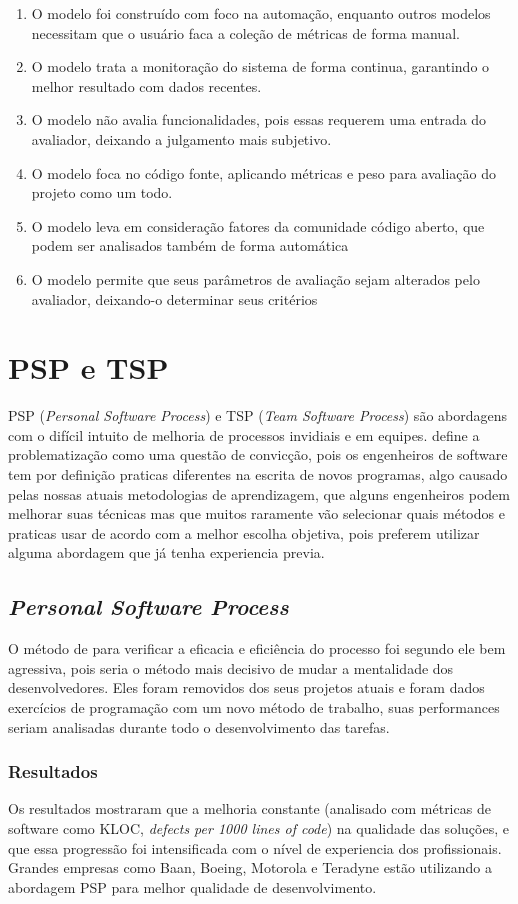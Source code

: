 \documentclass[12pt]{article}
\begin{document}
\begin{enumerate}
    \item O modelo foi construído com foco na automação, enquanto outros modelos necessitam que o usuário faca a coleção de métricas de forma manual.
    \item O modelo trata a monitoração do sistema de forma continua, garantindo o melhor resultado com dados recentes.
    \item O modelo não avalia funcionalidades, pois essas requerem uma entrada do avaliador, deixando a julgamento mais subjetivo.
    \item O modelo foca no código fonte, aplicando métricas e peso para avaliação do projeto como um todo.
    \item O modelo leva em consideração fatores da comunidade código aberto, que podem ser analisados também de forma automática
    \item O modelo permite que seus parâmetros de avaliação sejam alterados pelo avaliador, deixando-o determinar seus critérios
\end{enumerate}

\section{PSP e TSP}
PSP (\textit{Personal Software Process}) e TSP (\textit{Team Software Process}) são abordagens com o difícil intuito de melhoria de processos invidiais e em equipes. \cite{humphrey1999pathways} define a problematização como uma questão de convicção, pois os engenheiros de software tem por definição praticas diferentes na escrita de novos programas, algo causado pelas nossas atuais metodologias de aprendizagem, que alguns engenheiros podem melhorar suas técnicas mas que muitos raramente vão selecionar quais métodos e praticas usar de acordo com a melhor escolha objetiva, pois preferem utilizar alguma abordagem que já tenha experiencia previa.
\subsection{\textit{Personal Software Process}}
O método de \cite{humphrey1999pathways} para verificar a eficacia e eficiência do processo foi segundo ele bem agressiva, pois seria o método mais decisivo de mudar a mentalidade dos desenvolvedores. Eles foram removidos dos seus projetos atuais e foram dados exercícios de programação com um novo método de trabalho, suas performances seriam analisadas durante todo o desenvolvimento das tarefas.
\subsubsection{Resultados}
Os resultados mostraram que a melhoria constante (analisado com métricas de software como KLOC, \textit{defects per 1000 lines of code}) na qualidade das soluções, e que essa progressão foi intensificada com o nível de experiencia dos profissionais. Grandes empresas como Baan, Boeing, Motorola e Teradyne estão utilizando a abordagem PSP para melhor qualidade de desenvolvimento.
\end{document}
